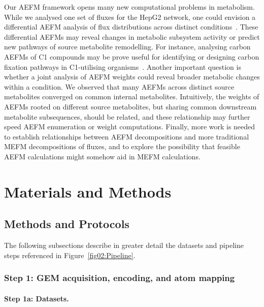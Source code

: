 \documentclass[12pt]{article}
\begin{document}
Our AEFM framework opens many new computational problems in metabolism.
While we analysed one set of fluxes for the HepG2 network, one could
envision a differential AEFM analysis of flux distributions across
distinct
conditions~\citep{GaluzziBrunoG.2024Affd,LiXuhang2025Efpa,RaviSudharshan2021Δmfa}.
These differential AEFMs may reveal changes in metabolic subsystem
activity or predict new pathways of source metabolite remodelling. For
instance, analysing carbon AEFMs of C1 compounds may be prove useful for
identifying or designing carbon fixation pathways in C1-utilising
organisms~\citep{AtaOzge2024Itmw}. Another important question is whether
a joint analysis of AEFM weights could reveal broader metabolic changes
within a condition. We observed that many AEFMs across distinct source
metabolites converged on common internal metabolites. Intuitively, the
weights of AEFMs rooted on different source metabolites, but sharing
common downstream metabolite subsequences, should be related, and these
relationship may further speed AEFM enumeration or weight computations.
Finally, more work is needed to establish relationships between AEFM
decompositions and more traditional MEFM decompositions of fluxes, and to
explore the possibility that feasible AEFM calculations might somehow aid
in MEFM calculations.

\section*{Materials and Methods}



\subsection*{Methods and Protocols}

The following subsections describe in greater detail the datasets and
pipeline steps referenced in Figure~\ref{fig02:Pipeline}.

\subsubsection*{Step 1: GEM acquisition, encoding, and atom mapping}

\paragraph{Step 1a: Datasets.}
\end{document}
